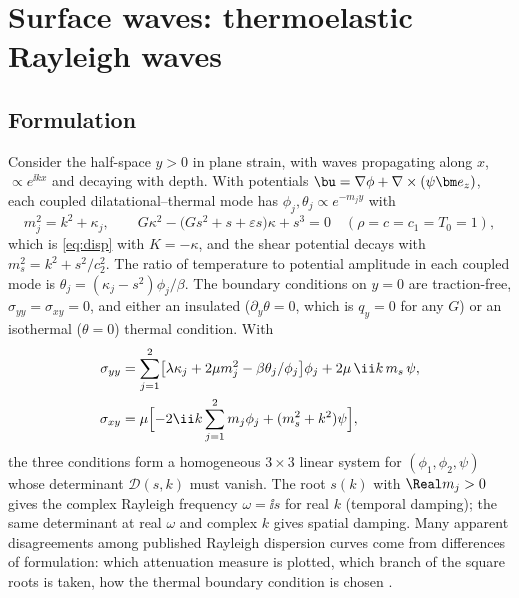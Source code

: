 \section{Surface waves: thermoelastic Rayleigh waves}\label{sec:surface}
\subsection{Formulation}
Consider the half-space $y>0$ in plane strain, with waves propagating along $x$, $\propto e^{\ii kx}$ and decaying with depth. With potentials $\bu=\nabla\phi+\nabla\times(\psi\bm e_z)$, each coupled dilatational--thermal mode has $\phi_j,\theta_j\propto e^{-m_jy}$ with
\begin{equation}
m_j^2=k^2+\kappa_j,\qquad G\kappa^2-\bigl(Gs^2+s+\varepsilon s\bigr)\kappa+s^3=0\quad(\rho=c=c_1=T_0=1),
\end{equation}
which is \eqref{eq:disp} with $K=-\kappa$, and the shear potential decays with $m_s^2=k^2+s^2/c_2^2$. The ratio of temperature to potential amplitude in each coupled mode is $\theta_j=(\kappa_j-s^2)\phi_j/\beta$. The boundary conditions on $y=0$ are traction-free, $\sigma_{yy}=\sigma_{xy}=0$, and either an insulated ($\partial_y\theta=0$, which is $q_y=0$ for any $G$) or an isothermal ($\theta=0$) thermal condition. With
\begin{align}
\sigma_{yy}&=\sum_{j=1}^2\bigl[\lambda\kappa_j+2\mu m_j^2-\beta\theta_j/\phi_j\bigr]\phi_j+2\mu\,\ii k\,m_s\,\psi,\\
\sigma_{xy}&=\mu\Bigl[-2\ii k\sum_{j=1}^2m_j\phi_j+(m_s^2+k^2)\psi\Bigr],
\end{align}
the three conditions form a homogeneous $3\times3$ linear system for $(\phi_1,\phi_2,\psi)$ whose determinant $\mathcal D(s,k)$ must vanish. The root $s(k)$ with $\Real m_j>0$ gives the complex Rayleigh frequency $\omega=\ii s$ for real $k$ (temporal damping); the same determinant at real $\omega$ and complex $k$ gives spatial damping. Many apparent disagreements among published Rayleigh dispersion curves come from differences of formulation: which attenuation measure is plotted, which branch of the square roots is taken, how the thermal boundary condition is chosen \citep{Biswas2020a,Tung2019,Gupta2024,Aldandani2026,Abouelregal2011,Biswas2020c,Chirita2012,Singh2013,Singh2015}.

